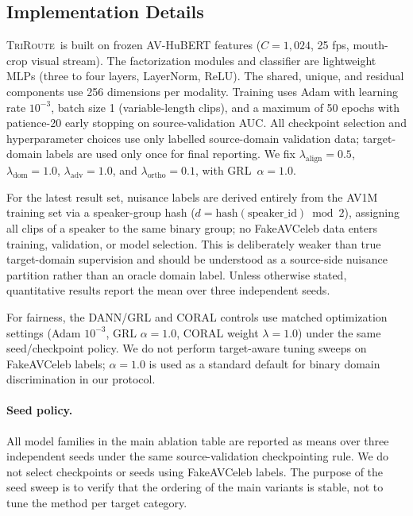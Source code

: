 \documentclass{article}
\newcommand{\method}{\textsc{TriRoute}}
\begin{document}
\subsection{Implementation Details}

\method\ is built on frozen AV-HuBERT \citep{shi2022avhubert} features ($C=1{,}024$, 25 fps, mouth-crop visual stream). The factorization modules and classifier are lightweight MLPs (three to four layers, LayerNorm, ReLU). The shared, unique, and residual components use 256 dimensions per modality. Training uses Adam with learning rate $10^{-3}$, batch size 1 (variable-length clips), and a maximum of 50 epochs with patience-20 early stopping on source-validation AUC. All checkpoint selection and hyperparameter choices use only labelled source-domain validation data; target-domain labels are used only once for final reporting. We fix $\lambda_{\mathrm{align}} = 0.5$, $\lambda_{\mathrm{dom}} = 1.0$, $\lambda_{\mathrm{adv}} = 1.0$, and $\lambda_{\mathrm{ortho}} = 0.1$, with GRL~$\alpha = 1.0$.

For the latest result set, nuisance labels are derived entirely from the AV1M training set via a speaker-group hash ($d = \mathrm{hash}(\mathrm{speaker\_id})\bmod 2$), assigning all clips of a speaker to the same binary group; no FakeAVCeleb data enters training, validation, or model selection. This is deliberately weaker than true target-domain supervision and should be understood as a source-side nuisance partition rather than an oracle domain label. Unless otherwise stated, quantitative results report the mean over three independent seeds.

For fairness, the DANN/GRL and CORAL controls use matched optimization settings (Adam $10^{-3}$, GRL $\alpha{=}1.0$, CORAL weight $\lambda{=}1.0$) under the same seed/checkpoint policy. We do not perform target-aware tuning sweeps on FakeAVCeleb labels; $\alpha{=}1.0$ is used as a standard default for binary domain discrimination in our protocol.

\paragraph{Seed policy.}
All model families in the main ablation table are reported as means over three independent seeds under the same source-validation checkpointing rule. We do not select checkpoints or seeds using FakeAVCeleb labels. The purpose of the seed sweep is to verify that the ordering of the main variants is stable, not to tune the method per target category.
\end{document}
